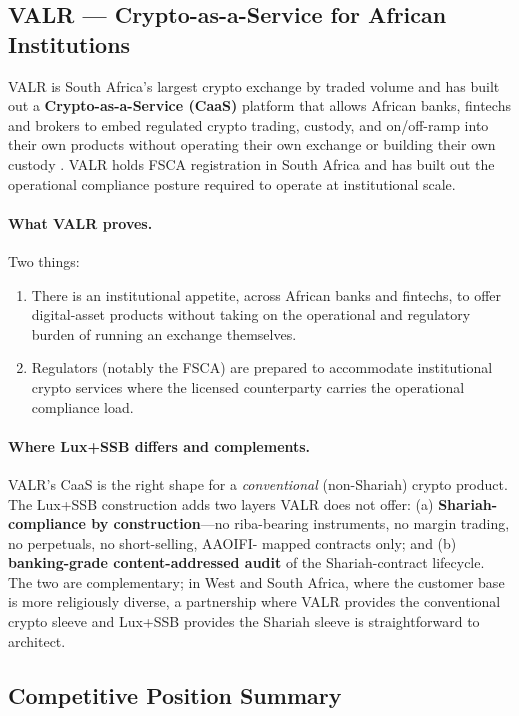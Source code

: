 \documentclass[11pt,letterpaper]{article}
\begin{document}
\subsection{VALR --- Crypto-as-a-Service for African Institutions}

VALR is South Africa's largest crypto exchange by traded volume and
has built out a \textbf{Crypto-as-a-Service (CaaS)} platform that
allows African banks, fintechs and brokers to embed regulated
crypto trading, custody, and on/off-ramp into their own products
without operating their own exchange or building their own custody
\cite{valr_caas, valr_site}. VALR holds FSCA registration in South
Africa and has built out the operational compliance posture required
to operate at institutional scale.

\paragraph{What VALR proves.} Two things:
\begin{enumerate}[leftmargin=1.6em]
  \item There is an institutional appetite, across African banks and
        fintechs, to offer digital-asset products without taking on
        the operational and regulatory burden of running an exchange
        themselves.
  \item Regulators (notably the FSCA) are prepared to accommodate
        institutional crypto services where the licensed counterparty
        carries the operational compliance load.
\end{enumerate}

\paragraph{Where Lux+SSB differs and complements.} VALR's CaaS is the
right shape for a \emph{conventional} (non-Shariah) crypto product.
The Lux+SSB construction adds two layers VALR does not offer: (a)
\textbf{Shariah-compliance by construction}---no riba-bearing
instruments, no margin trading, no perpetuals, no short-selling, AAOIFI-
mapped contracts only; and (b) \textbf{banking-grade content-addressed
audit} of the Shariah-contract lifecycle. The two are complementary;
in West and South Africa, where the customer base is more religiously
diverse, a partnership where VALR provides the conventional crypto
sleeve and Lux+SSB provides the Shariah sleeve is straightforward to
architect.

\subsection{Competitive Position Summary}
\end{document}
